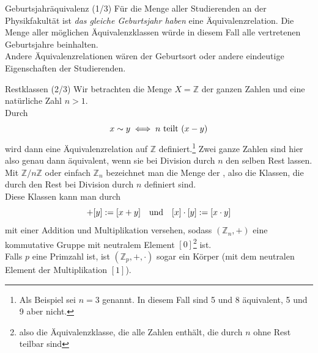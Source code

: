 \begin{Beispiel}
{Geburtsjahräquivalenz (1/3)}
Für die Menge aller Studierenden an der Physikfakultät ist \textit{das gleiche Geburtsjahr haben} eine Äquivalenzrelation. Die Menge aller möglichen Äquivalenzklassen würde in diesem Fall alle vertretenen Geburtsjahre beinhalten.\\
Andere Äquivalenzrelationen wären der Geburtsort oder andere eindeutige Eigenschaften der Studierenden.
\end{Beispiel}
\begin{Beispiel}
{Restklassen (2/3)}
Wir betrachten die Menge $X=\mathbb{Z}$ der ganzen Zahlen und eine natürliche Zahl $n>1$.\\
Durch 
\begin{equation*}
    x\sim y\iff n\text{ teilt }(x-y)
\end{equation*}
wird dann eine Äquivalenzrelation auf $\mathbb{Z}$ definiert.\footnote{Als Beispiel sei $n=3$ genannt. In diesem Fall sind 5 und 8 äquivalent, 5 und 9 aber nicht.} Zwei ganze Zahlen sind hier also genau dann äquivalent, wenn sie bei Division durch $n$ den selben Rest lassen.\\
Mit $\mathbb{Z}/n\mathbb{Z}$ oder einfach $\mathbb{Z}_n$ bezeichnet man die Menge der , also die Klassen, die durch den Rest bei Division durch $n$ definiert sind.\\
Diese Klassen kann man durch
\begin{equation*}
    [x]+[y]:=[x+y]\quad \tx{und}\quad [x]\cdot [y]:=[x\cdot y]
\end{equation*}
mit einer Addition und Multiplikation versehen, sodass $(\mathbb{Z}_n,+)$ eine kommutative Gruppe mit neutralem Element $[0]$\footnote{also die Äquivalenzklasse, die alle Zahlen enthält, die durch $n$ ohne Rest teilbar sind} ist.\\
Falls $p$ eine Primzahl ist, ist $(\mathbb{Z}_p,+,\cdot)$ sogar ein Körper (mit dem neutralen Element der Multiplikation $[1]$).
\end{Beispiel}
